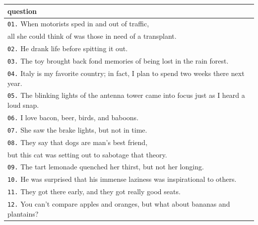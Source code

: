 \documentclass[11pt, twoside, reqno]{book}
\begin{document}
\begin{tabular}{|l|}
\hline
    question \\ \hline
    \texttt{01.}\hspace{8pt} When motorists sped in and out of traffic,\\\hspace{24pt} all she could think of was those in need of a transplant. \\ \hline
    \texttt{02.}\hspace{8pt} He drank life before spitting it out. \\ \hline
    \texttt{03.}\hspace{8pt} The toy brought back fond memories of being lost in the rain forest. \\ \hline
    \texttt{04.}\hspace{8pt} Italy is my favorite country; in fact, I plan to spend two weeks there next year. \\ \hline
    \texttt{05.}\hspace{8pt} The blinking lights of the antenna tower came into focus just as I heard a loud snap. \\ \hline
    \texttt{06.}\hspace{8pt} I love bacon, beer, birds, and baboons. \\ \hline
    \texttt{07.}\hspace{8pt} She saw the brake lights, but not in time. \\ \hline
    \texttt{08.}\hspace{8pt} They say that dogs are man's best friend, \\\hspace{24pt} but this cat was setting out to sabotage that theory. \\ \hline
    \texttt{09.}\hspace{8pt} The tart lemonade quenched her thirst, but not her longing. \\ \hline
    \texttt{10.}\hspace{8pt} He was surprised that his immense laziness was inspirational to others. \\ \hline
    \texttt{11.}\hspace{8pt} They got there early, and they got really good seats. \\ \hline
    \texttt{12.}\hspace{8pt} You can't compare apples and oranges, but what about bananas and plantains? \\ \hline
\end{tabular}
\vspace{16pt}
\end{document}

